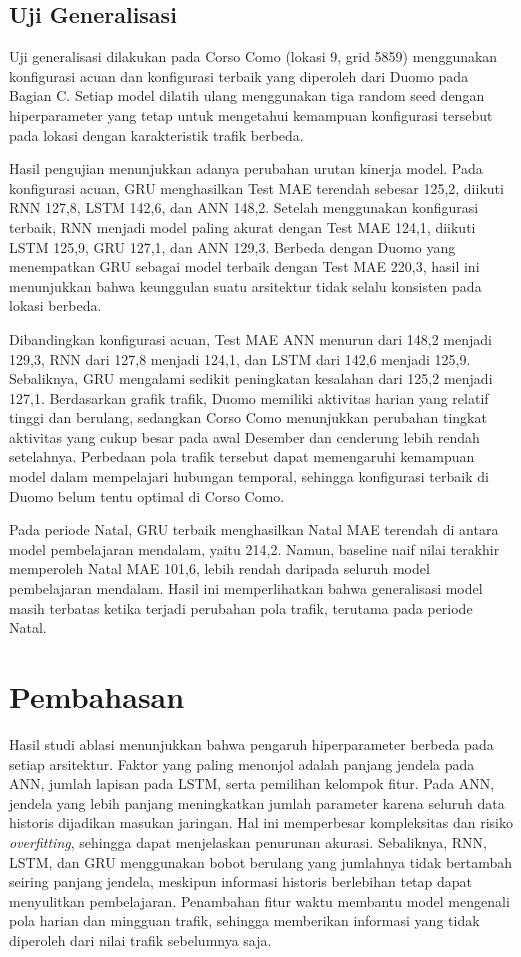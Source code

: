 \documentclass[conference,a4paper]{IEEEtran}
\begin{document}
\subsection{Uji Generalisasi}
Uji generalisasi dilakukan pada Corso Como (lokasi 9, grid 5859) menggunakan konfigurasi acuan dan konfigurasi terbaik yang diperoleh dari Duomo pada Bagian C. Setiap model dilatih ulang menggunakan tiga random seed dengan hiperparameter yang tetap untuk mengetahui kemampuan konfigurasi tersebut pada lokasi dengan karakteristik trafik berbeda.

Hasil pengujian menunjukkan adanya perubahan urutan kinerja model. Pada konfigurasi acuan, GRU menghasilkan Test MAE terendah sebesar 125,2, diikuti RNN 127,8, LSTM 142,6, dan ANN 148,2. Setelah menggunakan konfigurasi terbaik, RNN menjadi model paling akurat dengan Test MAE 124,1, diikuti LSTM 125,9, GRU 127,1, dan ANN 129,3. Berbeda dengan Duomo yang menempatkan GRU sebagai model terbaik dengan Test MAE 220,3, hasil ini menunjukkan bahwa keunggulan suatu arsitektur tidak selalu konsisten pada lokasi berbeda.

Dibandingkan konfigurasi acuan, Test MAE ANN menurun dari 148,2 menjadi 129,3, RNN dari 127,8 menjadi 124,1, dan LSTM dari 142,6 menjadi 125,9. Sebaliknya, GRU mengalami sedikit peningkatan kesalahan dari 125,2 menjadi 127,1. Berdasarkan grafik trafik, Duomo memiliki aktivitas harian yang relatif tinggi dan berulang, sedangkan Corso Como menunjukkan perubahan tingkat aktivitas yang cukup besar pada awal Desember dan cenderung lebih rendah setelahnya. Perbedaan pola trafik tersebut dapat memengaruhi kemampuan model dalam mempelajari hubungan temporal, sehingga konfigurasi terbaik di Duomo belum tentu optimal di Corso Como.

Pada periode Natal, GRU terbaik menghasilkan Natal MAE terendah di antara model pembelajaran mendalam, yaitu 214,2. Namun, baseline naif nilai terakhir memperoleh Natal MAE 101,6, lebih rendah daripada seluruh model pembelajaran mendalam. Hasil ini memperlihatkan bahwa generalisasi model masih terbatas ketika terjadi perubahan pola trafik, terutama pada periode Natal.

\section{Pembahasan}
Hasil studi ablasi menunjukkan bahwa pengaruh hiperparameter berbeda pada setiap arsitektur. Faktor yang paling menonjol adalah panjang jendela pada ANN, jumlah lapisan pada LSTM, serta pemilihan kelompok fitur. Pada ANN, jendela yang lebih panjang meningkatkan jumlah parameter karena seluruh data historis dijadikan masukan jaringan. Hal ini memperbesar kompleksitas dan risiko \textit{overfitting}, sehingga dapat menjelaskan penurunan akurasi. Sebaliknya, RNN, LSTM, dan GRU menggunakan bobot berulang yang jumlahnya tidak bertambah seiring panjang jendela, meskipun informasi historis berlebihan tetap dapat menyulitkan pembelajaran. Penambahan fitur waktu membantu model mengenali pola harian dan mingguan trafik, sehingga memberikan informasi yang tidak diperoleh dari nilai trafik sebelumnya saja.
\end{document}
